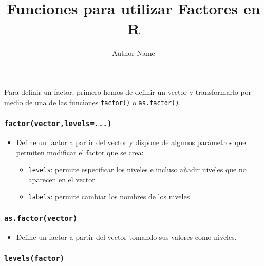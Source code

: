 \documentclass[
]{article}
\title{Funciones para utilizar Factores en R}
\author{Author Name}
\date{}
\providecommand{\tightlist}{%
  \setlength{\itemsep}{0pt}\setlength{\parskip}{0pt}}
\begin{document}
\let\maketitle\relax  
\leading{6.5mm} 
\setlength\baselineskip{6.5mm} 
\setlength\lineskiplimit{-\maxdimen}

\maketitle

Para definir un factor, primero hemos de definir un vector y
transformarlo por medio de una de las funciones \texttt{factor()} o
\texttt{as.factor()}.

\hypertarget{factorvectorlevels...}{%
\subsubsection{\texorpdfstring{\texttt{factor(vector,levels=...)}}{factor(vector,levels=...)}}\label{factorvectorlevels...}}

\begin{itemize}
\tightlist
\item
  Define un factor a partir del vector y dispone de algunos parámetros
  que permiten modificar el factor que se crea:

  \begin{itemize}
  \tightlist
  \item
    \texttt{levels}: permite especificar los niveles e incluso añadir
    niveles que no aparecen en el vector
  \item
    \texttt{labels}: permite cambiar los nombres de los niveles
  \end{itemize}
\end{itemize}

\hypertarget{as.factorvector}{%
\subsubsection{\texorpdfstring{\texttt{as.factor(vector)}}{as.factor(vector)}}\label{as.factorvector}}

\begin{itemize}
\tightlist
\item
  Define un factor a partir del vector tomando sus valores como niveles.
\end{itemize}

\hypertarget{levelsfactor}{%
\subsubsection{\texorpdfstring{\texttt{levels(factor)}}{levels(factor)}}\label{levelsfactor}}
\end{document}
